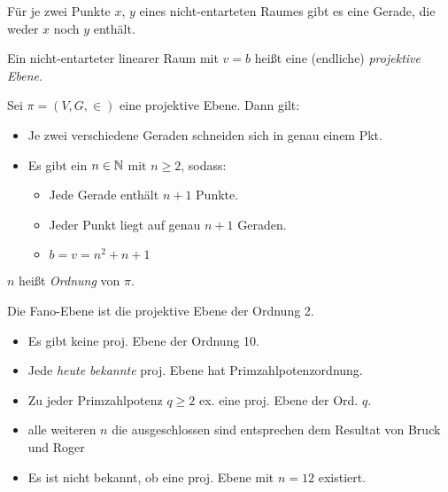 \documentclass{cheat-sheet}
\begin{document}
\begin{lem}
  Für je zwei Punkte $x$, $y$ eines nicht-entarteten Raumes gibt es eine Gerade, die weder $x$ noch $y$ enthält.
\end{lem}

\begin{defn}
  Ein nicht-entarteter linearer Raum mit $v = b$ heißt eine (endliche) \emph{projektive Ebene}.
\end{defn}

\begin{satz}
  Sei $\pi = (V, G, {\in})$ eine projektive Ebene.
  Dann gilt:
  \begin{itemize}
    \item Je zwei verschiedene Geraden schneiden sich in genau einem Pkt.
    \item Es gibt ein $n \in \mathbb{N}$ mit $n \geq 2$, sodass:
    \begin{itemize}
      \item Jede Gerade enthält $n+1$ Punkte.
      \item Jeder Punkt liegt auf genau $n+1$ Geraden.
      \item $b = v = n^2 + n + 1$
    \end{itemize}
  \end{itemize}
\end{satz}

\begin{defn}
  $n$ heißt \emph{Ordnung} von $\pi$.
\end{defn}

\begin{bsp}
  Die Fano-Ebene ist die projektive Ebene der Ordnung 2.
\end{bsp}



\begin{fakten}
  \begin{itemize}
    \item Es gibt keine proj. Ebene der Ordnung 10.
    \item Jede \textit{heute bekannte} proj. Ebene hat Primzahlpotenzordnung.
    \item Zu jeder Primzahlpotenz $q \geq 2$ ex. eine proj. Ebene der Ord. $q$.
    \item alle weiteren $n$ die ausgeschlossen sind entsprechen dem Resultat von Bruck und Roger
    \item Es ist nicht bekannt, ob eine proj. Ebene mit $n = 12$ existiert.
  \end{itemize}
\end{fakten}
\end{document}
